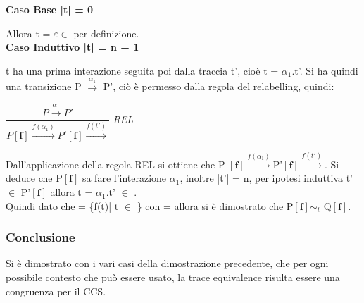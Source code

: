 \textbf{Caso Base |t| = 0}

Allora t = $\varepsilon \in$  per definizione.\\

\textbf{Caso Induttivo |t| = n + 1}

t ha una prima interazione seguita poi dalla traccia t', cioè t = $\alpha_{1}$.t'. Si ha quindi una transizione P $\overset{\alpha_{1}}\rightarrow$ P', ciò è permesso dalla regola del relabelling, quindi:

$\dfrac{P \overset{\alpha_{1}}\rightarrow P'}{P \mathbf{[f]} \overset{f(\alpha_{1})}\rightarrow P'\mathbf{[f]}\overset{f(t')}\rightarrow}$ \textit{REL} 

Dall'applicazione della regola REL si ottiene che P $\mathbf{[f]} \overset{f(\alpha_{1})}\rightarrow $P'$\mathbf{[f]}\overset{f(t')}\rightarrow$. Si deduce che P$\mathbf{[f]}$ sa fare l'interazione $\alpha_{1}$, inoltre |t'| = n, per ipotesi induttiva t'$\in$ P'$\mathbf{[f]}$ allora t = $\alpha_{1}$.t' $\in$ .\\

Quindi dato che  = \{f(t)| t $\in$ \} con  =  allora si è dimostrato che  P$\mathbf{[f]}\sim_{t}$ Q$\mathbf{[f]}$.\\

\subsubsection{Conclusione}
Si è dimostrato con i vari casi della dimostrazione precedente, che per ogni possibile contesto che può essere usato, la trace equivalence risulta essere una congruenza per il CCS. 
\pagebreak